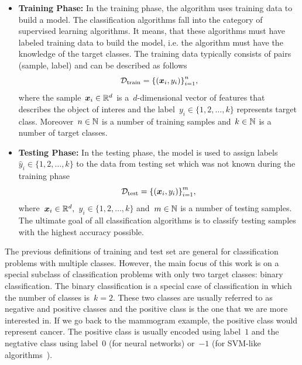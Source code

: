 \begin{itemize}
  \item \textbf{Training Phase:} In the training phase, the algorithm uses training data to build a model. The classification algorithms fall into the category of supervised learning algorithms. It means, that these algorithms must have labeled training data to build the model, i.e. the algorithm must have the knowledge of the target classes. The training data typically consists of pairs (sample, label) and can be described as follows
  \begin{equation*}\label{eq: training set}
    \mathcal{D}_{\mathrm{train}} = \Brac[c]{(\bm{x}_i, y_i)}_{i=1}^{n},
  \end{equation*}
  where the sample~$\bm{x}_i \in \mathbb{R}^d$ is a~$d$-dimensional vector of features that describes the object of interes and the label~$y_i \in \{1, 2, \ldots, k\}$ represents target class. Moreover~$n \in \mathbb{N}$ is a number of training samples and~$k \in \mathbb{N}$ is a number of target classes.
  \item \textbf{Testing Phase:} In the testing phase, the model is used to assign labels~$\hat{y}_i \in \{1, 2, \ldots, k\}$ to the data from testing set which was not known during the training phase
  \begin{equation*}\label{eq: test set}
    \mathcal{D}_{\mathrm{test}} = \Brac[c]{(\bm{x}_i, y_i)}_{i=1}^{m},
  \end{equation*}
  where~$\bm{x}_i \in \mathbb{R}^d,$~$y_i \in \{1, 2, \ldots, k\}$ and~$m \in \mathbb{N}$ is a number of testing samples. The ultimate goal of all classification algorithms is to classify testing samples with the highest accuracy possible.
\end{itemize}
The previous definitions of training and test set are general for classification problems with multiple classes. However, the main focus of this work is on a special subclass of classification problems with only two target classes: binary classification. The binary classification is a special case of classification in which the number of classes is~$k=2.$ These two classes are usually referred to as negative and positive classes and the positive class is the one that we are more interested in. If we go back to the mammogram example, the positive class would represent cancer. The positive class is usually encoded using label~$1$ and the negtative class using label~$0$ (for neural networks) or~$-1$ (for SVM-like algorithms~\cite{cortes1995support}).

